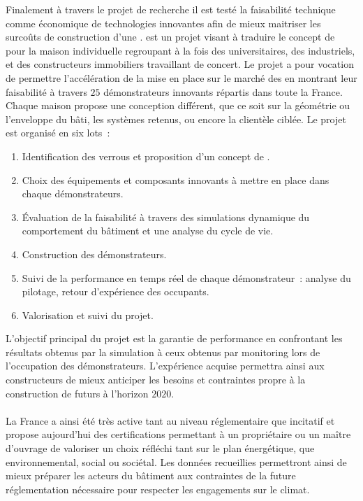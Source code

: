 Finalement à travers le projet de recherche  il est testé la faisabilité
technique comme économique de technologies innovantes afin de mieux maitriser les surcoûts
de construction d’une .  est un projet visant à traduire
le concept de  pour la maison individuelle regroupant à la fois des
universitaires, des industriels, et des constructeurs immobiliers travaillant de
concert. Le projet a pour vocation de permettre l’accélération de la mise en place sur le
marché des  en montrant leur faisabilité à travers $25$ démonstrateurs
innovants répartis dans toute la France. Chaque maison propose une conception différent,
que ce soit sur la géométrie ou l’enveloppe du bâti, les systèmes retenus, ou encore la
clientèle ciblée. Le projet est organisé en six lots~:
\begin{enumerate}
  \item Identification des verrous et proposition d’un concept de .
  \item Choix des équipements et composants innovants à mettre en place dans chaque
        démonstrateurs.
  \item Évaluation de la faisabilité à travers des simulations dynamique du comportement
        du bâtiment et une analyse du cycle de vie.
  \item Construction des démonstrateurs.
  \item Suivi de la performance en temps réel de chaque démonstrateur~: analyse du pilotage,
        retour d’expérience des occupants.
  \item Valorisation et suivi du projet.
\end{enumerate}
L’objectif principal du projet est la garantie de performance en confrontant les résultats
obtenus par la simulation à ceux obtenus par monitoring lors de l’occupation des
démonstrateurs. L’expérience acquise permettra ainsi aux constructeurs de mieux anticiper
les besoins et contraintes propre à la construction de futurs  à l’horizon
$2020$.

\paragraph{} %
La France a ainsi été très active tant au niveau réglementaire que incitatif et propose
aujourd’hui des certifications permettant à un propriétaire ou un maître d’ouvrage de
valoriser un choix réfléchi tant sur le plan énergétique, que environnemental, social ou
sociétal. Les données recueillies permettront ainsi de mieux préparer les acteurs
du bâtiment aux contraintes de la future réglementation nécessaire pour respecter les engagements sur le climat.


